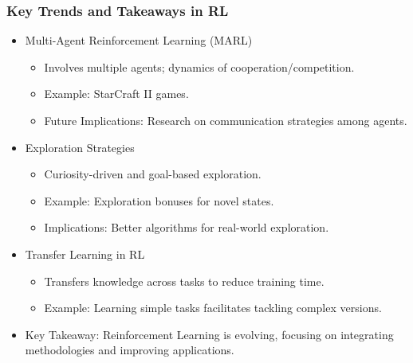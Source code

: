 \documentclass[aspectratio=169]{beamer}
\begin{document}
\begin{frame}[fragile]
    \frametitle{Key Trends and Takeaways in RL}
    \begin{itemize}
        \item Multi-Agent Reinforcement Learning (MARL)
        \begin{itemize}
            \item Involves multiple agents; dynamics of cooperation/competition.
            \item Example: StarCraft II games.
            \item Future Implications: Research on communication strategies among agents.
        \end{itemize}

        \item Exploration Strategies
        \begin{itemize}
            \item Curiosity-driven and goal-based exploration.
            \item Example: Exploration bonuses for novel states.
            \item Implications: Better algorithms for real-world exploration.
        \end{itemize}

        \item Transfer Learning in RL
        \begin{itemize}
            \item Transfers knowledge across tasks to reduce training time.
            \item Example: Learning simple tasks facilitates tackling complex versions.
        \end{itemize}
        
        \item Key Takeaway: Reinforcement Learning is evolving, focusing on integrating methodologies and improving applications.
    \end{itemize}
\end{frame}
\end{document}
